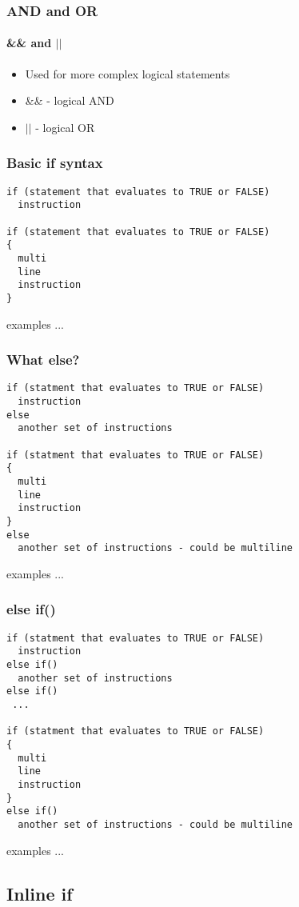 \documentclass[10pt]{beamer}
\begin{document}
\begin{frame}
  \frametitle{AND and OR}
  \framesubtitle{\&\& and $||$}
  
  \begin{itemize}
    \item Used for more complex logical statements
    \item \&\& - logical AND
    \item $||$ - logical OR
  \end{itemize}
\end{frame}

\begin{frame}[fragile]
  \frametitle{Basic if syntax}
  
  \begin{lstlisting}
if (statement that evaluates to TRUE or FALSE)
  instruction
  
if (statement that evaluates to TRUE or FALSE)
{
  multi
  line
  instruction
}  
    \end{lstlisting}
    
    examples ...
\end{frame}

\begin{frame}[fragile]
  \frametitle{What else?}
  
  \begin{lstlisting}
if (statment that evaluates to TRUE or FALSE)
  instruction
else
  another set of instructions
  
if (statment that evaluates to TRUE or FALSE)
{
  multi
  line
  instruction
}
else
  another set of instructions - could be multiline
    \end{lstlisting}
    
    examples ...
\end{frame}

\begin{frame}[fragile]
  \frametitle{else if()}
  
  \begin{lstlisting}
if (statment that evaluates to TRUE or FALSE)
  instruction
else if()
  another set of instructions
else if()
 ...
  
if (statment that evaluates to TRUE or FALSE)
{
  multi
  line
  instruction
}
else if()
  another set of instructions - could be multiline
    \end{lstlisting}
    
    examples ...
\end{frame}

\subsection{Inline if}
\end{document}
